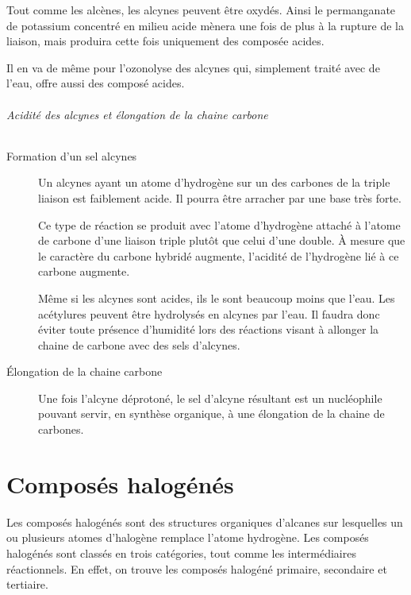 Tout comme les alcènes, les alcynes peuvent être oxydés.
Ainsi le permanganate de potassium concentré en milieu acide mènera une fois de plus à la rupture de la liaison, mais produira cette fois uniquement des composée acides.

Il en va de même pour l'ozonolyse des alcynes qui, simplement traité avec de l'eau, offre aussi des composé acides.

\paragraph{Acidité des alcynes et élongation de la chaine carbone}

\begin{description}

  \item[Formation d'un sel alcynes]

    Un alcynes ayant un atome d'hydrogène sur un des carbones de la triple liaison est faiblement acide.
    Il pourra être arracher par une base très forte.

    Ce type de réaction se produit avec l'atome d'hydrogène attaché à l'atome de carbone d'une liaison triple plutôt que celui d'une double.
    \`A mesure que le caractère du carbone hybridé augmente, l'acidité de l'hydrogène lié à ce carbone augmente.

    Même si les alcynes sont acides, ils le sont beaucoup moins que l'eau.
    Les acétylures peuvent être hydrolysés en alcynes par l'eau.
    Il faudra donc éviter toute présence d'humidité lors des réactions visant  à allonger la chaine de carbone avec des sels d'alcynes.

  \item[\'Elongation de la chaine carbone]

    Une fois l'alcyne déprotoné, le sel d'alcyne résultant est un nucléophile pouvant servir, en synthèse organique, à une élongation de la chaine de carbones.


\end{description}


\part{Composés halogénés}

Les composés halogénés sont des structures organiques d'alcanes sur lesquelles un ou plusieurs atomes d'halogène remplace l'atome hydrogène.
Les composés halogénés sont classés en trois catégories, tout comme les intermédiaires réactionnels.
En effet, on trouve les composés halogéné primaire, secondaire et tertiaire.

